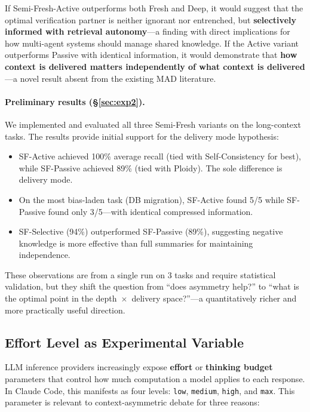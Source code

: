 \documentclass[11pt]{article}
\begin{document}
If Semi-Fresh-Active outperforms both Fresh and Deep, it would suggest that the optimal verification partner is neither ignorant nor entrenched, but \textbf{selectively informed with retrieval autonomy}---a finding with direct implications for how multi-agent systems should manage shared knowledge. If the Active variant outperforms Passive with identical information, it would demonstrate that \textbf{how context is delivered matters independently of what context is delivered}---a novel result absent from the existing MAD literature.

\paragraph{Preliminary results (\S\ref{sec:exp2}).} We implemented and evaluated all three Semi-Fresh variants on the long-context tasks. The results provide initial support for the delivery mode hypothesis:

\begin{itemize}[leftmargin=1.5em]
  \item SF-Active achieved 100\% average recall (tied with Self-Consistency for best), while SF-Passive achieved 89\% (tied with Ploidy). The sole difference is delivery mode.
  \item On the most bias-laden task (DB migration), SF-Active found 5/5 while SF-Passive found only 3/5---with identical compressed information.
  \item SF-Selective (94\%) outperformed SF-Passive (89\%), suggesting negative knowledge is more effective than full summaries for maintaining independence.
\end{itemize}

These observations are from a single run on 3 tasks and require statistical validation, but they shift the question from ``does asymmetry help?'' to ``what is the optimal point in the depth~$\times$~delivery space?''---a quantitatively richer and more practically useful direction.

\subsection{Effort Level as Experimental Variable}
\label{sec:effort}

LLM inference providers increasingly expose \textbf{effort} or \textbf{thinking budget} parameters that control how much computation a model applies to each response. In Claude Code, this manifests as four levels: \texttt{low}, \texttt{medium}, \texttt{high}, and \texttt{max}. This parameter is relevant to context-asymmetric debate for three reasons:
\end{document}
